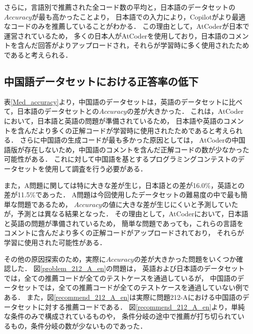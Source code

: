   さらに，言語別で推薦された全コード数の平均と，日本語のデータセットの$Accuracy$が最も高かったことより，
  日本語での入力により，Copilotがより最適なコードのみを推薦していることがわかる．
  この理由として，AtCoder\cite{AtCoder}が日本で運営されているため，
  多くの日本人がAtCoderを使用しており，日本語のコメントを含んだ回答がよりアップロードされ，それらが学習時に多く使用されたためであると考えられる．
  \subsection{中国語データセットにおける正答率の低下}
  表\ref{Med_accuracy}より，中国語のデータセットは，英語のデータセットに比べて，日本語のデータセットとの$Accuracy$の差が大きかった．
  これは，AtCoder\cite{AtCoder}において，日本語と英語の問題が準備されているため，
  日本語や英語のコメントを含んだより多くの正解コードが学習時に使用されたためであると考えられる．
  さらに中国語の生成コードが最も多かった原因としては，
  AtCoderの中国語版が存在しないため，中国語のコメントを含んだ正解コードの数が少なかった可能性がある．
  これに対して中国語を基とするプログラミングコンテストのデータセットを使用して調査を行う必要がある．
  
  また，A問題に関しては特に大きな差が生じ，日本語との差が16.0\%，英語との差が11.5\%であった．
  A問題は今回使用したデータセットの難易度の中で最も簡単な問題であるため，
  $Accuracy$の値に大きな差が生じにくいと予測していたが，予測とは異なる結果となった．
  その理由として，AtCoder\cite{AtCoder}において，日本語と英語の問題が準備されているため，
  簡単な問題であっても，これらの言語をコメントに含んだより多くの正解コードがアップロードされており，
  それらが学習に使用された可能性がある．

  その他の原因探索のため，実際に$Accuracy$の差が大きかった問題をいくつか確認した．
  図\ref{problem_212_A_en}の問題は，
  英語および日本語のデータセットでは，全ての推薦コードが全てのテストケースを通過しているが，
  中国語のデータセットでは，全ての推薦コードが全てのテストケースを通過していない例である．
  また，図\ref{recommend_212_A_en}は実際に問題212-Aにおける中国語のデータセットに対する推薦コードである．
  図\ref{recommend_212_A_en}より，単純な条件のみで構成されているものや，
  条件分岐の途中で推薦が打ち切られているもの，条件分岐の数が少ないものであった．
  
